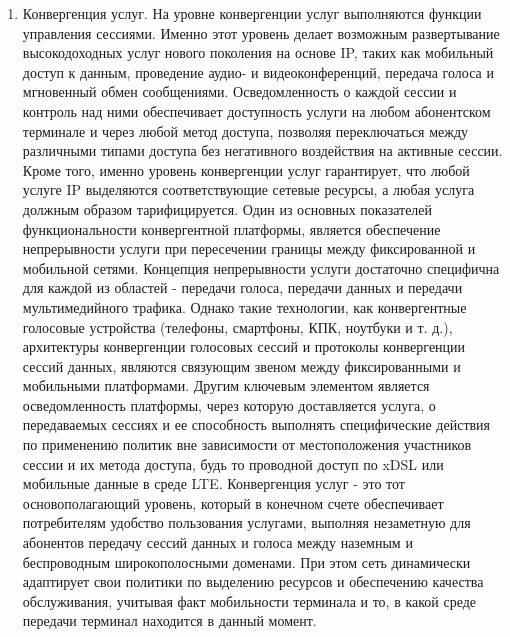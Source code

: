 \begin{enumerate}
\item Конвергенция услуг. На уровне конвергенции услуг выполняются функции управления сессиями. Именно этот уровень делает возможным развертывание высокодоходных услуг нового поколения на основе IP, таких как мобильный доступ к данным, проведение аудио- и видеоконференций, передача голоса и мгновенный обмен сообщениями. Осведомленность о каждой сессии и контроль над ними обеспечивает доступность услуги на любом абонентском терминале и через любой метод доступа, позволяя переключаться между различными типами доступа без негативного воздействия на активные сессии. Кроме того, именно уровень конвергенции услуг гарантирует, что любой услуге IP выделяются соответствующие сетевые ресурсы, а любая услуга должным образом тарифицируется. Один из основных показателей функциональности конвергентной платформы, является обеспечение непрерывности услуги при пересечении границы между фиксированной и мобильной сетями. Концепция непрерывности услуги достаточно специфична для каждой из областей - передачи голоса, передачи данных и передачи мультимедийного трафика. Однако такие технологии, как конвергентные голосовые устройства (телефоны, смартфоны, КПК, ноутбуки и т. д.), архитектуры конвергенции голосовых сессий и протоколы конвергенции сессий данных, являются связующим звеном между фиксированными и мобильными платформами. Другим ключевым элементом является осведомленность платформы, через которую доставляется услуга, о передаваемых сессиях и ее способность выполнять специфические действия по применению политик вне зависимости от местоположения участников сессии и их метода доступа, будь то проводной доступ по xDSL или мобильные данные в среде LTE. Конвергенция услуг - это тот основополагающий уровень, который в конечном счете обеспечивает потребителям удобство пользования услугами, выполняя незаметную для абонентов передачу сессий данных и голоса между наземным и беспроводным широкополосными доменами. При этом сеть динамически адаптирует свои политики по выделению ресурсов и обеспечению качества обслуживания, учитывая факт мобильности терминала и то, в какой среде передачи терминал находится в данный момент.


\end{enumerate}
